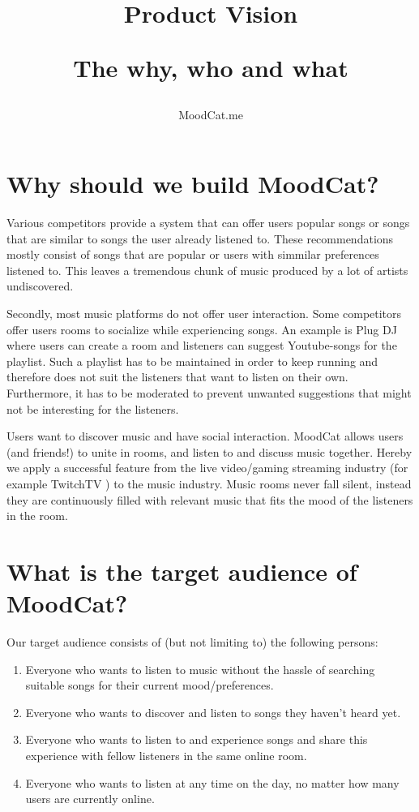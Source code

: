\documentclass[10pt,a4paper]{article}
\begin{document}
\title{Product Vision\\
	\begin{small}
	The why, who and what
	\end{small}
}
\author{MoodCat.me}
\maketitle

\section{Why should we build MoodCat?}
Various competitors provide a system that can offer users popular songs or songs that are similar to songs the user already listened to.
These recommendations mostly consist of songs that are popular or users with simmilar preferences listened to.
This leaves a tremendous chunk of music produced by a lot of artists undiscovered.

Secondly, most music platforms do not offer user interaction.
Some competitors offer users rooms to socialize while experiencing songs.
An example is Plug DJ \cite{PlugDJ} where users can create a room and listeners can suggest Youtube-songs\cite{Youtube} for the playlist.
Such a playlist has to be maintained in order to keep running and therefore does not suit the listeners that want to listen on their own.
Furthermore, it has to be moderated to prevent unwanted suggestions that might not be interesting for the listeners.

\bigskip 

Users want to discover music and have social interaction.
MoodCat allows users (and friends!) to unite in rooms, and listen to and discuss music together.
Hereby we apply a successful feature from the live video/gaming streaming industry (for example TwitchTV \cite{Twitch}) to the music industry.
Music rooms never fall silent, instead they are continuously filled with relevant music that fits the mood of the listeners in the room.

\section{What is the target audience of MoodCat?}
Our target audience consists of (but not limiting to) the following persons:

\begin{enumerate}
\item Everyone who wants to listen to music without the hassle of searching suitable songs for their current mood/preferences.

\item Everyone who wants to discover and listen to songs they haven't heard yet.

\item Everyone who wants to listen to and experience songs and share this experience with fellow listeners in the same online room.

\item Everyone who wants to listen at any time on the day, no matter how many users are currently online.
\end{enumerate}
\end{document}
